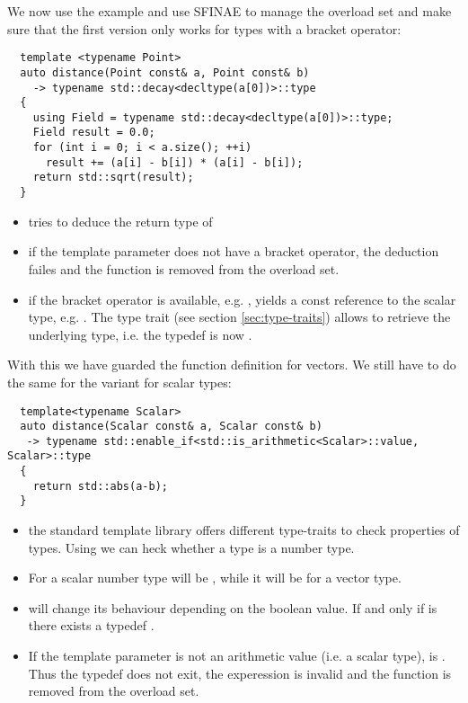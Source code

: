 \begin{example}
  We now use the  example and use SFINAE to manage the
  overload set and make sure that the first version only works for
  types with a bracket operator:
  \begin{verbatim}
  template <typename Point>
  auto distance(Point const& a, Point const& b)
    -> typename std::decay<decltype(a[0])>::type
  {
    using Field = typename std::decay<decltype(a[0])>::type;
    Field result = 0.0;
    for (int i = 0; i < a.size(); ++i)
      result += (a[i] - b[i]) * (a[i] - b[i]);
    return std::sqrt(result);
  }
  \end{verbatim}
  \begin{itemize}
  \item {} tries to deduce the return type of
  \item if the template parameter does not have a bracket operator,
    the deduction failes and the function is removed from the overload
    set.
  \item if the bracket operator is available,
    e.g. ,  yields a
    const reference to the scalar type, e.g. . The
    type trait (see section \ref{sec:type-traits}) 
    allows to retrieve the underlying type, i.e. the typedef
     is now .
  \end{itemize}

  With this we have guarded the function definition for vectors. We
  still have to do the same for the variant for scalar types:
  \begin{verbatim}
  template<typename Scalar>
  auto distance(Scalar const& a, Scalar const& b)
   -> typename std::enable_if<std::is_arithmetic<Scalar>::value, Scalar>::type
  {
    return std::abs(a-b);
  }
  \end{verbatim}
  \begin{itemize}
  \item the standard template library offers different type-traits to
    check properties of types. Using  we can
    heck whether a type is a number type.
  \item For a scalar number type
     will be , while
    it will be  for a vector type.
  \item {} will change its behaviour
    depending on the boolean value. If and only if  is  there
    exists a typedef .
  \item If the template parameter is not an arithmetic value (i.e. a
    scalar type),  is
    . Thus the typedef  does
    not exit, the experession is invalid and the function is removed
    from the overload set.
  \end{itemize}
\end{example}

